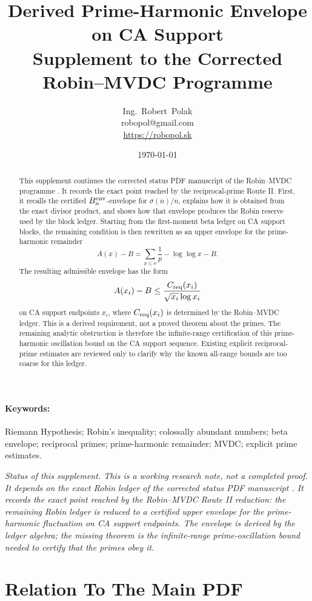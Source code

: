 \documentclass[11pt,a4paper]{article}
\title{\bfseries Derived Prime-Harmonic Envelope on CA Support\\
\large Supplement to the Corrected Robin--MVDC Programme}
\author{Ing.~Robert~Polak \\ \small robopol@gmail.com \\ \small \url{https://robopol.sk}}
\date{\today}
\begin{document}
\maketitle

\begin{abstract}
This supplement continues the corrected status PDF manuscript of the
Robin--MVDC programme \cite{polakcorrected2026}. It records the exact point
reached by the reciprocal-prime Route II. First, it recalls the certified
\(B_n^{\rm env}\)-envelope for \(\sigma(n)/n\), explains how it is obtained
from the exact divisor product, and shows how that envelope produces the
Robin reserve used by the block ledger. Starting from the first-moment beta
ledger on CA support blocks, the remaining condition is then rewritten as an
upper envelope for the prime-harmonic remainder
\[
  A(x)-B
  =
  \sum_{p\le x}\frac1p-\log\log x-B.
\]
The resulting admissible envelope has the form
\[
  A(x_i)-B
  \le
  \frac{C_{\rm req}(x_i)}{\sqrt{x_i}\log x_i}
\]
on CA support endpoints \(x_i\), where \(C_{\rm req}(x_i)\) is determined by
the Robin--MVDC ledger. This is a derived requirement, not a proved theorem
about the primes. The remaining analytic obstruction is therefore the
infinite-range certification of this prime-harmonic oscillation bound on the
CA support sequence. Existing explicit reciprocal-prime estimates are reviewed
only to clarify why the known all-range bounds are too coarse for this
ledger.
\end{abstract}

\paragraph{Keywords:} Riemann Hypothesis; Robin's inequality; colossally
abundant numbers; beta envelope; reciprocal primes; prime-harmonic remainder;
MVDC; explicit prime estimates.

\noindent\emph{Status of this supplement. This is a working research note, not a
completed proof. It depends on the exact Robin ledger of the corrected status
PDF manuscript \cite{polakcorrected2026}. It records the exact point reached by
the Robin--MVDC Route II reduction: the remaining Robin ledger is reduced to a
certified upper envelope for the prime-harmonic fluctuation on CA support
endpoints. The envelope is derived by the ledger algebra; the missing theorem
is the infinite-range prime-oscillation bound needed to certify that the primes
obey it.}

\section{Relation To The Main PDF}
\end{document}
